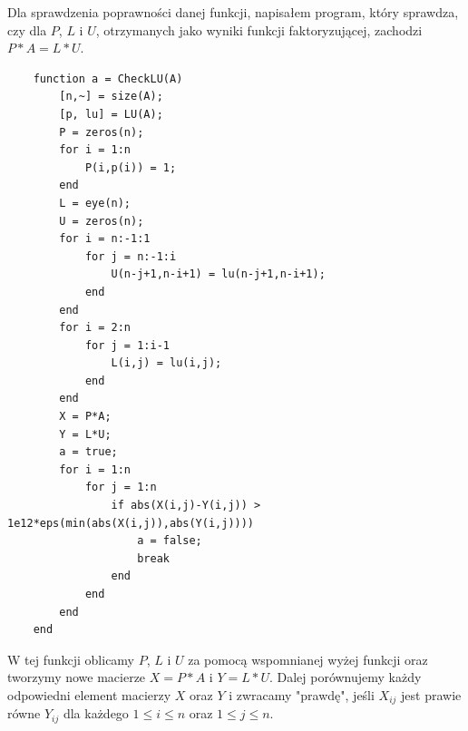 \documentclass[12pt,a4paper]{article}
\begin{document}
  Dla sprawdzenia poprawności danej funkcji, napisałem program, który sprawdza, czy
  dla $P$, $L$ i $U$, otrzymanych jako wyniki funkcji faktoryzującej, zachodzi
  $P*A=L*U$.
\begin{Verbatim}
    function a = CheckLU(A)
        [n,~] = size(A);
        [p, lu] = LU(A);
        P = zeros(n);
        for i = 1:n
            P(i,p(i)) = 1;
        end
        L = eye(n);
        U = zeros(n);
        for i = n:-1:1
            for j = n:-1:i
                U(n-j+1,n-i+1) = lu(n-j+1,n-i+1);
            end
        end
        for i = 2:n
            for j = 1:i-1
                L(i,j) = lu(i,j);
            end
        end
        X = P*A;
        Y = L*U;
        a = true;
        for i = 1:n
            for j = 1:n
                if abs(X(i,j)-Y(i,j)) > 1e12*eps(min(abs(X(i,j)),abs(Y(i,j))))
                    a = false;
                    break
                end
            end
        end
    end
\end{Verbatim}
W tej funkcji oblicamy $P$, $L$ i $U$ za pomocą wspomnianej wyżej funkcji oraz
tworzymy nowe macierze $X=P*A$ i $Y=L*U$. Dalej porównujemy każdy odpowiedni element
macierzy $X$ oraz $Y$ i zwracamy "prawdę", jeśli $X_{ij}$ jest prawie równe
$Y_{ij}$ dla każdego $1 \leq i \leq n$ oraz $1 \leq j \leq n$.
\end{document}
